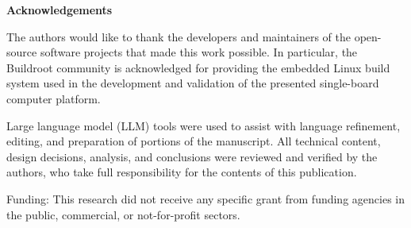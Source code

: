 \textbf{Acknowledgements}\\
\noindent

The authors would like to thank the developers and maintainers of the open-source software projects that made this work possible. 
In particular, 
the Buildroot community is acknowledged for providing the embedded Linux build system used in the development and validation of the presented single-board computer platform.

Large language model (LLM) tools were used to assist with language refinement, editing, 
and preparation of portions of the manuscript. 
All technical content, design decisions, analysis, and conclusions were reviewed and verified by the authors, 
who take full responsibility for the contents of this publication.

Funding: This research did not receive any specific grant from funding agencies in the public, commercial, 
or not-for-profit sectors.
